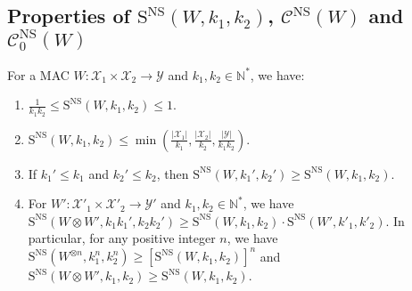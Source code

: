 \subsection{Properties of $\mathrm{S}^{\mathrm{NS}}(W,k_1,k_2)$, $\mathcal{C}^{\mathrm{NS}}(W)$ and $\mathcal{C}^{\mathrm{NS}}_0(W)$}
\begin{proposition}
  \label{prop:oneShot}
  For a MAC $W: \mathcal{X}_1 \times \mathcal{X}_2 \rightarrow \mathcal{Y}$ and $k_1,k_2 \in \mathbb{N}^*$, we have:
  \begin{enumerate}
  \item $\frac{1}{k_1k_2} \leq \mathrm{S}^{\mathrm{NS}}(W,k_1,k_2) \leq 1$.
  \item $\mathrm{S}^{\mathrm{NS}}(W,k_1,k_2) \leq \min\left(\frac{|\mathcal{X}_1|}{k_1}, \frac{|\mathcal{X}_2|}{k_2}, \frac{|\mathcal{Y}|}{k_1k_2} \right)$.
  \item If $k_1' \leq k_1$ and $k_2' \leq k_2$, then $\mathrm{S}^{\mathrm{NS}}(W,k_1',k_2') \geq \mathrm{S}^{\mathrm{NS}}(W,k_1,k_2)$.
    
  \item For $W': \mathcal{X}'_1 \times \mathcal{X}'_2 \rightarrow \mathcal{Y}'$ and $k_1,k_2 \in \mathbb{N}^*$, we have $\mathrm{S}^{\mathrm{NS}}(W \otimes W',k_1k_1',k_2k_2') \geq \mathrm{S}^{\mathrm{NS}}(W,k_1,k_2) \cdot \mathrm{S}^{\mathrm{NS}}(W',k'_1,k'_2)$. In particular, for any positive integer $n$, we have $\mathrm{S}^{\mathrm{NS}}(W^{\otimes n},k_1^n,k_2^n) \geq \left[\mathrm{S}^{\mathrm{NS}}(W,k_1,k_2)\right]^n$ and $\mathrm{S}^{\mathrm{NS}}(W \otimes W',k_1,k_2) \geq \mathrm{S}^{\mathrm{NS}}(W,k_1,k_2)$.
  \end{enumerate}
\end{proposition}
